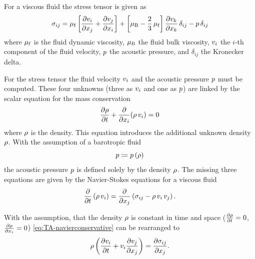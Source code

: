 For a viscous fluid the stress tensor is given as
\begin{equation}
  \sigma_{ij} = \mu_{\mathrm{f}}\left[ \pdv{v_{i}}{x_{j}} + \pdv{v_{j}}{x_{i}} \right] + 
  \left[ \mu_{\mathrm{B}} - \frac{2}{3}\,\mu_{\mathrm{f}} \right] \pdv{v_{k}}{x_{k}} 
  \,\delta_{ij} - p\,\delta_{ij}
  \label{eq:TA-stress}
\end{equation}
where $\mu_{\mathrm{f}}$ is the fluid dynamic viscosity, $\mu_{\mathrm{B}}$ the fluid bulk 
viscosity, $v_{i}$ the $i$-th component of the fluid velocity, $p$ the 
acoustic pressure, and $\delta_{ij}$ the Kronecker delta.

For the stress tensor the fluid velocity $v_{i}$ and the acoustic pressure 
$p$ must be computed. These four unknowns (three as $v_{i}$ and one as 
$p$) are linked by the scalar equation for the mass conservation
\begin{equation}
  \pdv{\rho}{t} + \pdv{x_{i}}(\rho\,v_{i}) = 0
  \label{eq:TA-massconservation}
\end{equation}
where $\rho$ is the density. This equation introduces the additional 
unknown density $\rho$. With the assumption of a barotropic fluid
\begin{equation}
  p \coloneqq p\left( \rho \right)
  \label{eq:TA-state}
\end{equation}
the acoustic pressure $p$ is defined solely by the density $\rho$. The 
missing three equations are given by the Navier-Stokes equations for a viscous 
fluid
\begin{equation}
  \pdv{t}\left( \rho\,v_{i} \right) = \pdv{x_{j}} \left( \sigma_{ij} - 
  \rho\,v_{i}\,v_{j} \right).
    \label{eq:TA-navierconservative}
\end{equation}

With the assumption, that the density $\rho$ is constant in time and space 
($\pdv{\rho}{t} = 0$, $\pdv{\rho}{x_{i}} =0$)
\cref{eq:TA-navierconservative} can be rearranged to
\begin{equation}
  \rho\left( \pdv{v_{i}}{t} + v_{i}\pdv{v_{j}}{x_{j}}\right) = 
  \pdv{\sigma_{ij}}{x_{j}}.
  \label{eq:TA-navier}
\end{equation}

